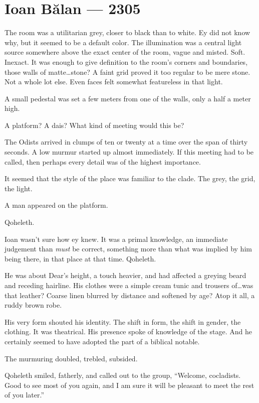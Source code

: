 \hypertarget{ioan-bux103lan-2305}{%
\chapter*{Ioan Bălan — 2305}\label{ioan-bux103lan-2305}}

The room was a utilitarian grey, closer to black than to white. Ey did not know why, but it seemed to be a default color. The illumination was a central light source somewhere above the exact center of the room, vague and misted. Soft. Inexact. It was enough to give definition to the room's corners and boundaries, those walls of matte\ldots{}stone? A faint grid proved it too regular to be mere stone. Not a whole lot else. Even faces felt somewhat featureless in that light.

A small pedestal was set a few meters from one of the walls, only a half a meter high.

A platform? A dais? What kind of meeting would this be?

The Odists arrived in clumps of ten or twenty at a time over the span of thirty seconds. A low murmur started up almost immediately. If this meeting had to be called, then perhaps every detail was of the highest importance.

It seemed that the style of the place was familiar to the clade. The grey, the grid, the light.

A man appeared on the platform.

Qoheleth.

Ioan wasn't sure how ey knew. It was a primal knowledge, an immediate judgement than \emph{must} be correct, something more than what was implied by him being there, in that place at that time. Qoheleth.

He was about Dear's height, a touch heavier, and had affected a greying beard and receding hairline. His clothes were a simple cream tunic and trousers of\ldots{}was that leather? Coarse linen blurred by distance and softened by age? Atop it all, a ruddy brown robe.

His very form shouted his identity. The shift in form, the shift in gender, the clothing. It was theatrical. His presence spoke of knowledge of the stage. And he certainly seemed to have adopted the part of a biblical notable.

The murmuring doubled, trebled, subsided.

Qoheleth smiled, fatherly, and called out to the group, ``Welcome, cocladists. Good to see most of you again, and I am sure it will be pleasant to meet the rest of you later.''

